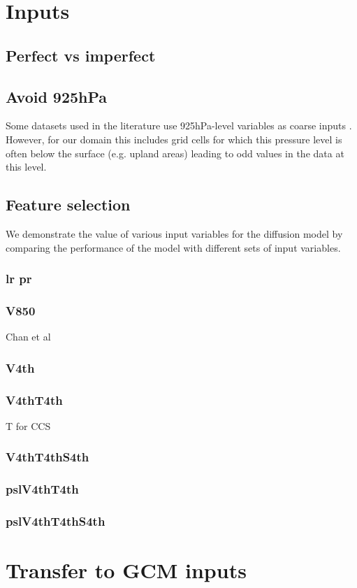 \section{Inputs}

\subsection{Perfect vs imperfect}

\subsection{Avoid 925hPa}

Some datasets used in the literature use 925hPa-level variables as coarse inputs \parencite[e.g.][]{}.
However, for our domain this includes grid cells for which this pressure level is often below the surface (e.g. upland areas) leading to odd values in the data at this level.

\subsection{Feature selection}

We demonstrate the value of various input variables for the diffusion model by comparing the performance of the model with different sets of input variables.

\subsubsection{lr pr}

\subsubsection{V850}

Chan et al

\subsubsection{V4th}

\subsubsection{V4thT4th}

T for CCS

\subsubsection{V4thT4thS4th}

\subsubsection{pslV4thT4th}

\subsubsection{pslV4thT4thS4th}

\section{Transfer to GCM inputs}